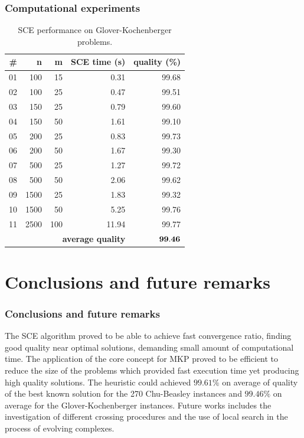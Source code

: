 \documentclass[10pt,fleqn]{beamer}
\begin{document}
\begin{frame}
	\frametitle{Computational experiments}
\begin{table}
{
\renewcommand{\arraystretch}{1.5}%
\fontsize{8.5pt}{1em}\selectfont 
\begin{center}
\begin{tabular}{|r|r|r|r|r|} \hline
		\textbf{\#} & \textbf{n}   & \textbf{m}  & \textbf{SCE time (s)} & \textbf{quality (\%)} \\ \hline
01 & 100 & 15 & 0.31 & 99.68 \\ \hline
02 & 100 & 25 & 0.47 & 99.51 \\ \hline
03 & 150 & 25 & 0.79 & 99.60 \\ \hline
04 & 150 & 50 & 1.61 & 99.10 \\ \hline
05 & 200 & 25 & 0.83 & 99.73 \\ \hline
06 & 200 & 50 & 1.67 & 99.30 \\ \hline
07 & 500 & 25 & 1.27 & 99.72 \\ \hline
08 & 500 & 50 & 2.06 & 99.62 \\ \hline
09 &1500 & 25 & 1.83 & 99.32 \\ \hline
10 &1500 & 50 & 5.25 & 99.76 \\ \hline
11 &2500 &100 &11.94 & 99.77 \\ \cline{1-5}
    \multicolumn{4}{|r|}{\textbf{average quality}}  & $\bf 99.46$  \\ \hline
\end{tabular}
\end{center}
}
 \caption{SCE performance on Glover-Kochenberger problems.}
 \label{tab:gk}
\end{table}
\end{frame}

\section{Conclusions and future remarks}

\begin{frame}
	\frametitle{Conclusions and future remarks}
The SCE algorithm proved to be able to achieve fast convergence ratio,
finding good quality near optimal solutions, demanding small
amount of computational time.
\vfill
The application of the core concept for MKP proved to be efficient to reduce
the size of the problems which provided fast execution time yet producing
high quality solutions.
\vfill
The heuristic could achieved $99.61\%$ on average of quality of the best known solution for
the 270 Chu-Beasley instances and $99.46\%$ on average for the Glover-Kochenberger instances.
\vfill
Future works includes the investigation of different crossing procedures 
and the use of local search in the process of evolving complexes.
\end{frame}

\begin{frame}
	\vspace*{30pt}
	\qquad \qquad {\bf Thank you!}
\end{frame}
\end{document}
